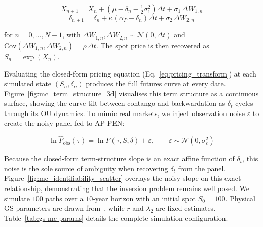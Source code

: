\documentclass[11pt, a4paper]{article}
\begin{document}
\begin{equation}
X_{n+1} = X_n + \left(\mu - \delta_n - \tfrac{1}{2}\sigma_1^2\right)\Delta t + \sigma_1\,\Delta W_{1,n}
\label{eq:x_discrete_em}
\end{equation}
\begin{equation}
    \delta_{n+1} = \delta_n + \kappa\left(\alpha_P - \delta_n\right)\Delta t + \sigma_2\,\Delta W_{2,n}
    \label{eq:delta_discrete_em}
\end{equation}

for $n = 0,\dots,N-1$, with $\Delta W_{1,n},\Delta W_{2,n}\sim\mathcal{N}(0,\Delta t)$ and $\mathrm{Cov}(\Delta W_{1,n},\Delta W_{2,n})=\rho\,\Delta t$. The spot price is then recovered as $S_n = \exp(X_n)$.

Evaluating the closed-form pricing equation (Eq.~\ref{eq:pricing_transform}) at each simulated state $(S_n, \delta_n)$ produces the full futures curve at every date. Figure~\ref{fig:mc_term_structure_3d} visualises this term structure as a continuous surface, showing the curve tilt between contango and backwardation as $\delta_t$ cycles through its OU dynamics. To mimic real markets, we inject observation noise $\varepsilon$ to create the noisy panel fed to AP-PEN:

\begin{equation}
\ln \hat{F}_{\text{obs}}(\tau) = \ln F(\tau, S, \delta) + \varepsilon, \qquad \varepsilon \sim \mathcal{N}(0,\sigma_\varepsilon^2)
\label{eq:noise-model}
\end{equation}

Because the closed-form term-structure slope is an exact affine function of $\delta_t$, this noise is the sole source of ambiguity when recovering $\delta_t$ from the panel. Figure~\ref{fig:mc_identifiability_scatter} overlays the noisy slope on this exact relationship, demonstrating that the inversion problem remains well posed. We simulate $100$ paths over a $10$-year horizon with an initial spot $S_0 = 100$. Physical GS parameters are drawn from~\cite{Schwartz1997TheHedging}, while $r$ and $\lambda_2$ are fixed estimates. Table~\ref{tab:gs-mc-params} details the complete simulation configuration.
\end{document}
